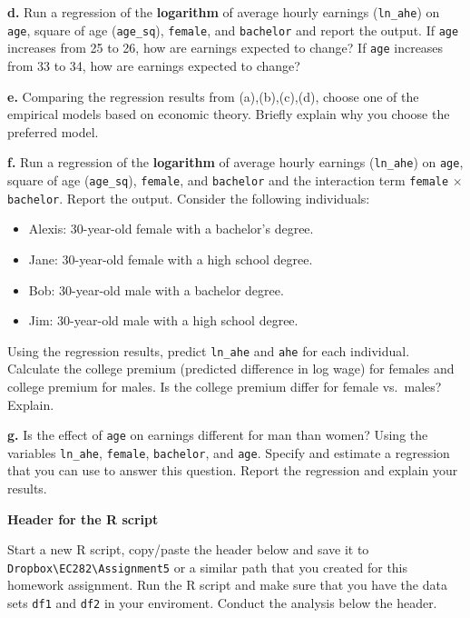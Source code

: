 \documentclass[
]{book}
\providecommand{\tightlist}{%
  \setlength{\itemsep}{0pt}\setlength{\parskip}{0pt}}
\begin{document}
\textbf{d.} Run a regression of the \textbf{logarithm} of average hourly earnings (\texttt{ln\_ahe}) on \texttt{age}, square of age (\texttt{age\_sq}), \texttt{female}, and \texttt{bachelor} and report the output. If \texttt{age} increases from
25 to 26, how are earnings expected to change? If \texttt{age} increases from 33 to 34, how are earnings expected to change?

\textbf{e.} Comparing the regression results from (a),(b),(c),(d), choose one of the empirical models based on economic theory. Briefly explain why you choose the preferred model.

\textbf{f.} Run a regression of the \textbf{logarithm} of average hourly earnings (\texttt{ln\_ahe}) on \texttt{age}, square of age (\texttt{age\_sq}), \texttt{female}, and \texttt{bachelor} and the interaction term \texttt{female} \(\times\) \texttt{bachelor}. Report the output. Consider the following individuals:

\begin{itemize}
\tightlist
\item
  Alexis: 30-year-old female with a bachelor's degree.
\item
  Jane: 30-year-old female with a high school degree.
\item
  Bob: 30-year-old male with a bachelor degree.
\item
  Jim: 30-year-old male with a high school degree.
\end{itemize}

Using the regression results, predict \texttt{ln\_ahe} and \texttt{ahe} for each individual. Calculate the college premium (predicted difference in log wage) for females and college premium for males. Is the college premium differ for female vs.~males? Explain.

\textbf{g.} Is the effect of \texttt{age} on earnings different for man than women? Using the variables \texttt{ln\_ahe}, \texttt{female}, \texttt{bachelor}, and \texttt{age}. Specify and estimate a regression that you can use to answer this question. Report the regression and explain your results.

\textbf{Header for the R script}

Start a new R script, copy/paste the header below and save it to \texttt{Dropbox\textbackslash{}EC282\textbackslash{}Assignment5} or a similar path that you created for this homework assignment. Run the R script and make sure that you have the data sets \texttt{df1} and \texttt{df2} in your enviroment. Conduct the analysis below the header.
\end{document}
